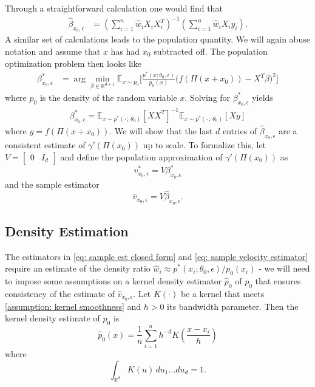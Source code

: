 \documentclass[11pt]{article}
\begin{document}
Through a straightforward calculation one would find that
\begin{align}
    \widehat{\beta}_{x_0,\epsilon} &= \left(\sum_{i = 1}^n\hat{w}_iX_iX_i^T\right)^{-1}\left(\sum_{i = 1}^n\hat{w}_iX_iy_i\right). \label{eq: sample est closed form}
\end{align}
A similar set of calculations leads to the population quantity. We will again abuse notation and assume that $x$ has had $x_0$ subtracted off. The population optimization problem then looks like
\begin{align}
\beta^*_{x_0, \epsilon} &= \arg\min_{\beta \in \mathbb{R}^{d+1}} \mathbb{E}_{x\sim p_0} \Big[\frac{p^*(x;\theta_0, \epsilon)}{p_0(x)}\Big(f(\Pi(x + x_0)) - X^{T}\beta \Big)^2\Big] \label{eq: population estimator}
\end{align}
where $p_0$ is the density of the random variable $x$. Solving for $\beta^*_{x_0, \epsilon}$ yields
\begin{align}
    \beta^*_{x_0, \epsilon} = \mathbb{E}_{x \sim p^*(\cdot\,; \, \theta_0)}\left[XX^T\right]^{-1}\mathbb{E}_{x \sim p^*(\cdot\,;\,\theta_0)}\left[Xy\right] \label{eq: population est closed form}
\end{align}
where $y = f(\Pi(x+x_0))$. We will show that the last $d$ entries of $\widehat{\beta}_{x_0,\epsilon}$ are a consistent estimate of $\gamma'(\Pi(x_0))$ up to scale. To formalize this, let $V = \begin{bmatrix} 0 & I_d\end{bmatrix}$ and define the population approximation of $\gamma'(\Pi(x_0))$ as
\begin{equation}
    v^*_{x_0, \epsilon} = V\beta^*_{x_0, \epsilon} \label{eq: population velocity estimator}
\end{equation}
and the sample estimator
\begin{equation}
    \hat{v}_{x_0, \epsilon} = V\hat{\beta}_{x_0, \epsilon}. \label{eq: sample velocity estimator}
\end{equation}

\subsection{Density Estimation}

The estimators in \cref{eq: sample est closed form} and \cref{eq: sample velocity estimator} require an estimate of the density ratio $\hat{w}_i \approx p^*(x_i;\theta_0, \epsilon)/p_0(x_i)$ -  we will need to impose some assumptions on a kernel density estimator $\hat{p}_0$ of $p_0$ that ensures consistency of the estimate of $\hat{v}_{x_0, \epsilon}$. Let $K(\cdot)$ be a kernel that meets \cref{assumption: kernel smoothness} and $h > 0$ its bandwidth parameter. Then the kernel density estimate of $p_0$ is
\begin{equation}
    \hat{p}_0(x) = \frac{1}{n}\sum_{i = 1}^nh^{-d}K\left(\frac{x -x_i}{h}\right) \label{eq: kde}
\end{equation}
where 
\[\int_{\mathbb{R}^d}K(u)\,du_1\dots du_d = 1.\]
\end{document}
